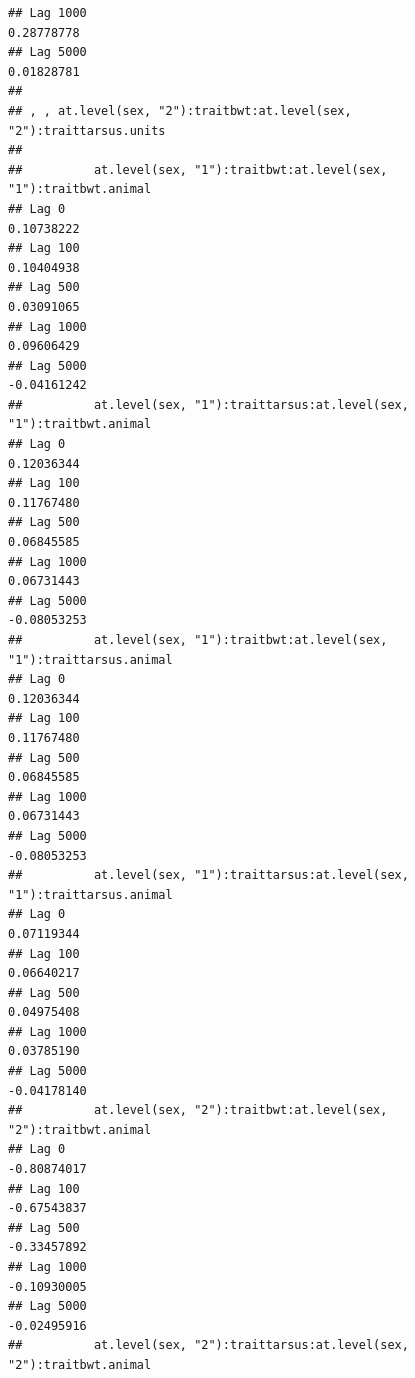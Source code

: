 \documentclass[
  12pt,
]{book}
\begin{document}
\begin{verbatim}
## Lag 1000                                                          0.28778778
## Lag 5000                                                          0.01828781
## 
## , , at.level(sex, "2"):traitbwt:at.level(sex, "2"):traittarsus.units
## 
##          at.level(sex, "1"):traitbwt:at.level(sex, "1"):traitbwt.animal
## Lag 0                                                        0.10738222
## Lag 100                                                      0.10404938
## Lag 500                                                      0.03091065
## Lag 1000                                                     0.09606429
## Lag 5000                                                    -0.04161242
##          at.level(sex, "1"):traittarsus:at.level(sex, "1"):traitbwt.animal
## Lag 0                                                           0.12036344
## Lag 100                                                         0.11767480
## Lag 500                                                         0.06845585
## Lag 1000                                                        0.06731443
## Lag 5000                                                       -0.08053253
##          at.level(sex, "1"):traitbwt:at.level(sex, "1"):traittarsus.animal
## Lag 0                                                           0.12036344
## Lag 100                                                         0.11767480
## Lag 500                                                         0.06845585
## Lag 1000                                                        0.06731443
## Lag 5000                                                       -0.08053253
##          at.level(sex, "1"):traittarsus:at.level(sex, "1"):traittarsus.animal
## Lag 0                                                              0.07119344
## Lag 100                                                            0.06640217
## Lag 500                                                            0.04975408
## Lag 1000                                                           0.03785190
## Lag 5000                                                          -0.04178140
##          at.level(sex, "2"):traitbwt:at.level(sex, "2"):traitbwt.animal
## Lag 0                                                       -0.80874017
## Lag 100                                                     -0.67543837
## Lag 500                                                     -0.33457892
## Lag 1000                                                    -0.10930005
## Lag 5000                                                    -0.02495916
##          at.level(sex, "2"):traittarsus:at.level(sex, "2"):traitbwt.animal

\end{verbatim}
\end{document}
